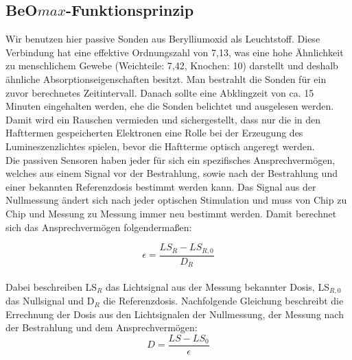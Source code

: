 \subsection{BeO$max$-Funktionsprinzip}
Wir benutzen hier passive Sonden aus Berylliumoxid als Leuchtstoff. Diese Verbindung hat eine effektive Ordnungszahl von 7,13, was eine hohe Ähnlichkeit zu menschlichem Gewebe (Weichteile: 7,42, Knochen: 10) darstellt und deshalb ähnliche Absorptionseigenschaften besitzt.
Man bestrahlt die Sonden für ein zuvor berechnetes Zeitintervall. Danach sollte eine Abklingzeit von ca. 15 Minuten eingehalten werden, ehe die Sonden belichtet und ausgelesen werden. Damit wird ein Rauschen vermieden und sichergestellt, dass nur die in den Hafttermen gespeicherten Elektronen eine Rolle bei der Erzeugung des Lumineszenzlichtes spielen, bevor die Haftterme optisch angeregt werden.\\
Die passiven Sensoren haben jeder für sich ein spezifisches Ansprechvermögen, welches aus einem Signal vor der Bestrahlung, sowie nach der Bestrahlung und einer bekannten Referenzdosis bestimmt werden kann. Das Signal aus der Nullmessung ändert sich nach jeder optischen Stimulation und muss von Chip zu Chip und Messung zu Messung immer neu bestimmt werden. Damit berechnet sich das Ansprechvermögen folgendermaßen:

\begin{equation} \label{eq:ansprechvermoegen}
    \epsilon = \frac{LS_R - LS_{R,0}}{D_R}
\end{equation}
\ \\
Dabei beschreiben LS$_R$ das Lichtsignal aus der Messung bekannter Dosis, LS$_{R,0}$ das Nullsignal und D$_R$ die Referenzdosis.
Nachfolgende Gleichung beschreibt die Errechnung der Dosis aus den Lichtsignalen der Nullmessung, der Messung nach der Bestrahlung und dem Ansprechvermögen: \cite{PA_alt}
\begin{equation}
    D = \frac{LS - LS_0}{\epsilon}
\end{equation}